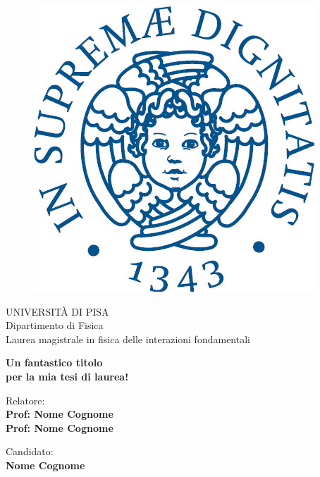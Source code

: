 \begin{titlepage}
\begin{figure}[!htb]
    \centering
    \includegraphics[keepaspectratio=true,scale=0.5]{figures/Title_page/cherubinFrontespizio.jpeg}
\end{figure}

\begin{center}
    \LARGE{UNIVERSITÀ DI PISA}
    \vspace{5mm}
    \\ \large{Dipartimento di Fisica}
    \vspace{5mm}
    \\ \LARGE{Laurea magistrale in fisica delle interazioni fondamentali}
\end{center}

\vspace{15mm}
\begin{center}
    {\LARGE{\bf Un fantastico titolo\\ \vspace{5mm} per la mia tesi di laurea! }}
    
    
\end{center}
\vspace{30mm}

\begin{minipage}[t]{0.47\textwidth}
	{\large{Relatore:}{\normalsize\vspace{3mm}
	\bf\\ \large{Prof: Nome Cognome} \normalsize\vspace{3mm}\bf \\ \large{Prof: Nome Cognome}}}
\end{minipage}
\hfill
\begin{minipage}[t]{0.47\textwidth}\raggedleft
	{\large{Candidato:}{\normalsize\vspace{3mm} \bf\\ \large{Nome Cognome}}}
\end{minipage}

\vspace{30mm}
\hrulefill
\\

\end{titlepage}